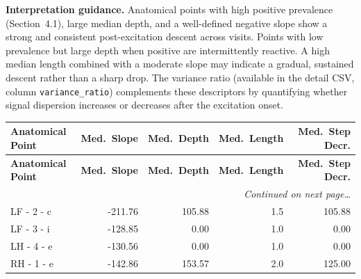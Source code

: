 \documentclass[a4paper,11pt]{article}
\begin{document}
\medskip
\noindent\textbf{Interpretation guidance.}
Anatomical points with high positive prevalence (Section~4.1), large median depth, and a
well-defined negative slope show a strong and consistent post-excitation descent across
visits.
Points with low prevalence but large depth when positive are intermittently reactive.
A high median length combined with a moderate slope may indicate a gradual, sustained
descent rather than a sharp drop.
The variance ratio (available in the detail CSV, column \texttt{variance\_ratio}) complements
these descriptors by quantifying whether signal dispersion increases or decreases after the
excitation onset.

\begin{small}
\begin{longtable}{p{4.5cm}rrrr}
\toprule
\textbf{Anatomical Point} &
\textbf{Med.\ Slope} &
\textbf{Med.\ Depth} &
\textbf{Med.\ Length} &
\textbf{Med.\ Step Decr.} \\
\midrule
\endfirsthead
\toprule
\textbf{Anatomical Point} &
\textbf{Med.\ Slope} &
\textbf{Med.\ Depth} &
\textbf{Med.\ Length} &
\textbf{Med.\ Step Decr.} \\
\midrule
\endhead
\midrule
\multicolumn{5}{r}{\small\emph{Continued on next page\ldots}} \\
\endfoot
\bottomrule
\endlastfoot
LF - 2 - c & -211.76 & 105.88 & 1.5 & 105.88 \\
LF - 3 - i & -128.85 & 0.00 & 1.0 & 0.00 \\
LH - 4 - e & -130.56 & 0.00 & 1.0 & 0.00 \\
RH - 1 - e & -142.86 & 153.57 & 2.0 & 125.00 \\
\end{longtable}
\end{small}
\end{document}
